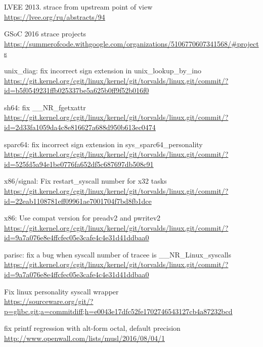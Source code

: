 \documentclass[russian,a4paper,12pt]{article}
\begin{document}
\begin{thebibliography}{9}

 LVEE 2013. strace from upstream point of view \\
\url{https://lvee.org/ru/abstracts/94}

 GSoC 2016 strace projects \\
\url{https://summerofcode.withgoogle.com/organizations/5106770607341568/#projects}

 unix\_diag: fix incorrect sign extension in
unix\_lookup\_by\_ino \\
\url{https://git.kernel.org/cgit/linux/kernel/git/torvalds/linux.git/commit/?id=b5f0549231ffb025337be5a625b0ff9f52b016f0}

 sh64: fix \_\_NR\_fgetxattr \\
\url{https://git.kernel.org/cgit/linux/kernel/git/torvalds/linux.git/commit/?id=2d33fa1059da4c8e816627a688d950b613ec0474}

 sparc64: fix incorrect sign extension in
sys\_sparc64\_personality \\
\url{https://git.kernel.org/cgit/linux/kernel/git/torvalds/linux.git/commit/?id=525fd5a94e1be0776fa652df5c687697db508c91}

 x86/signal: Fix restart\_syscall number for x32 tasks \\
\url{https://git.kernel.org/cgit/linux/kernel/git/torvalds/linux.git/commit/?id=22eab1108781eff09961ae7001704f7bd8fb1dce}

 x86: Use compat version for preadv2 and pwritev2 \\
\url{https://git.kernel.org/cgit/linux/kernel/git/torvalds/linux.git/commit/?id=9a7a076e8e4ffcfec05e3cafe4c4e31d41ddbaa0}

 parisc: fix a bug when syscall number of tracee is \_\_NR\_Linux\_syscalls \\
\url{https://git.kernel.org/cgit/linux/kernel/git/torvalds/linux.git/commit/?id=9a7a076e8e4ffcfec05e3cafe4c4e31d41ddbaa0}

 Fix linux personality syscall wrapper \\
\url{https://sourceware.org/git/?p=glibc.git;a=commitdiff;h=e0043e17dfc52fe1702746543127cb4a87232bcd}

 fix printf regression with alt-form octal, default precision \\
\url{http://www.openwall.com/lists/musl/2016/08/04/1}

\end{thebibliography}
\end{document}
